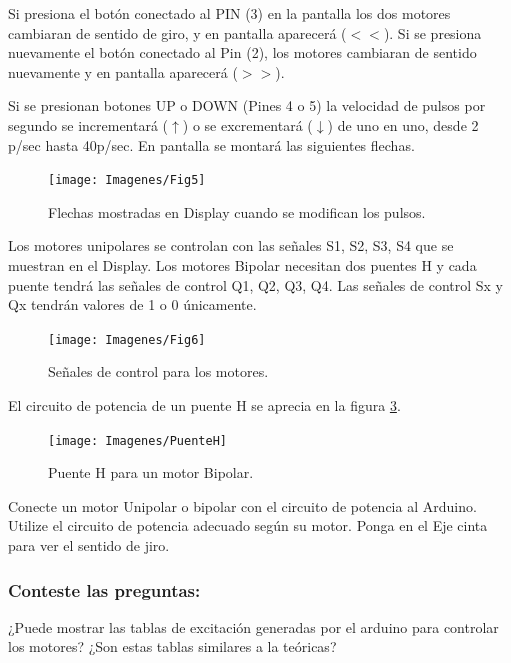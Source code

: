 Si presiona el botón conectado al PIN (3) en la pantalla los dos motores cambiaran de sentido de giro, y en pantalla aparecerá ($<<$). Si se presiona nuevamente el botón conectado al Pin (2), los motores cambiaran de sentido nuevamente y en pantalla aparecerá ($>>$).

Si se presionan botones UP o DOWN (Pines 4 o 5) la velocidad de pulsos por segundo se incrementará ($\uparrow$) o se excrementará ($\downarrow$) de uno en uno, desde 2 p/sec hasta 40p/sec. En pantalla se montará las siguientes flechas.
\begin{figure}[H]
	\centering
	\texttt{[image: Imagenes/Fig5]}
	\caption{Flechas mostradas en Display cuando se modifican los pulsos. }
	\label{fig:fig5}
\end{figure}
Los motores unipolares se controlan con las señales S1, S2, S3, S4 que se muestran en el Display. Los motores Bipolar necesitan dos puentes H y cada puente tendrá las señales de control Q1, Q2, Q3, Q4.  Las señales de control Sx y Qx tendrán valores de 1 o 0 únicamente.

\begin{figure}[H]
	\centering
	\texttt{[image: Imagenes/Fig6]}
	\caption{Señales de control para los motores.}
	\label{fig:fig6}
\end{figure}

El circuito de potencia de un puente H se aprecia en la figura \ref{fig:puenteh}.
\begin{figure}[H]
	\centering
	\texttt{[image: Imagenes/PuenteH]}
	\caption{Puente H para un motor Bipolar.}
	\label{fig:puenteh}
\end{figure}

Conecte un motor Unipolar o bipolar con el circuito de potencia al Arduino. Utilize el circuito de potencia adecuado según su motor. Ponga en el Eje cinta para ver el sentido de jiro.

\subsubsection{Conteste las preguntas:} 

¿Puede mostrar las tablas de excitación generadas por el arduino para controlar los motores?
¿Son estas tablas similares a la teóricas?
